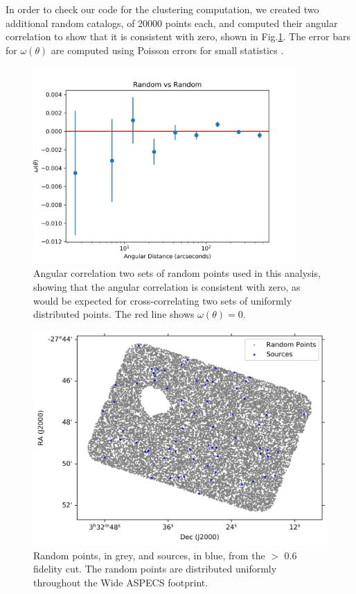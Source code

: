 In order to check our code for the clustering computation, we created two additional random catalogs, of 20000 points each, and computed their angular correlation to show that it is consistent with zero, shown in Fig.\ref{fig:random_points}. The error bars for $\omega(\theta)$ are computed using Poisson errors for small statistics \cite{1986ApJ...303..336G}.

\begin{figure}[!htbp]
\centering \includegraphics[width=100mm]{clustering/5Random_vs_Random_10000_bin9.png}
\caption{Angular correlation two sets of random points used in this analysis, showing that the angular correlation is consistent with zero, as would be expected for cross-correlating two sets of uniformly distributed points. The red line shows $\omega(\theta) = 0$.}
\label{fig:random_points}
\end{figure}

\begin{figure}[!htbp]
\centering \includegraphics[width=120mm]{PDFS/NX_V_Y_Sources_20000.png}
\caption{Random points, in grey, and sources, in blue, from the $>$ 0.6 fidelity cut. The random points are distributed uniformly throughout the Wide ASPECS footprint.}
\label{fig:Clustering_points}
\end{figure}

